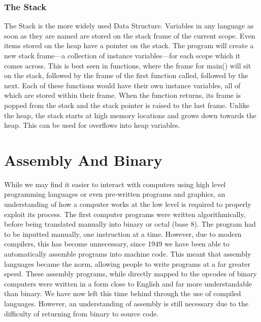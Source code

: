 \documentclass[a4paper,11pt]{report}
\begin{document}
					\subsubsection{The Stack}
						The Stack is the more widely used Data Structure. 
						Variables in any language as soon as they are named are stored on the stack frame of the current scope. 
						Even items stored on the heap have a pointer on the stack. 
						The program will create a new stack frame---a collection of instance variables---for each scope which it comes across. 
						This is best seen in functions, where the frame for main() will sit on the stack, followed by the frame of the first function called, followed by the next. 
						Each of these functions would have their own instance variables, all of which are stored within their frame. 
						When the function returns, its frame is popped from the stack and the stack pointer is raised to the last frame. 
						Unlike the heap, the stack starts at high memory locations and grows down towards the heap. 
						This can be used for overflows into heap variables. 

	\section{Assembly And Binary}
		While we may find it easier to interact with computers using high level programming languages or even pre-written programs and graphics, an understanding of how a computer works at the low level is required to properly exploit its process. 
		The first computer programs were written algorithmically, before being translated manually into binary or octal (base 8). 
		The program had to be inputted manually, one instruction at a time. 
		However, due to modern compilers, this has become unnecessary, since 1949 we have been able to automatically assemble programs into machine code. 
		This meant that assembly languages became the norm, allowing people to write programs at a far greater speed.
		These assembly programs, while directly mapped to the opcodes of binary computers were written in a form close to English and far more understandable than binary. 
		We have now left this time behind through the use of compiled languages. 
		However, an understanding of assembly is still necessary due to the difficulty of returning from binary to source code. 
\end{document}
